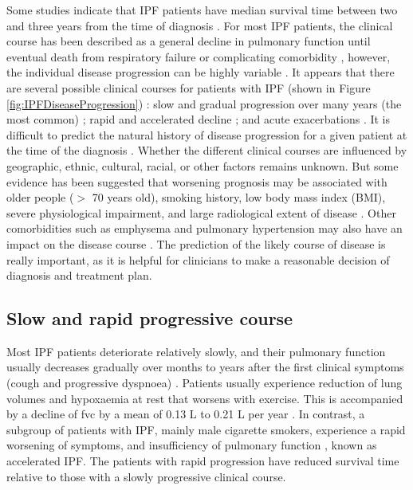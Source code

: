 Some studies indicate that IPF patients have median survival time between two and three years from the time of diagnosis \citep{bjoraker1998prognostic, flaherty2002clinical, nicholson2000prognostic, rudd2007british, king2001idiopathic, king2011idiopathic}. For most IPF patients, the clinical course has been described as a general decline in pulmonary function until eventual death from respiratory failure or complicating comorbidity \citep{carrington1978natural, tukiainen1983prognosis, gross2001idiopathic}, however, the individual disease progression can be highly variable \citep{kim2006classification,meltzer2008idiopathic}. It appears that there are several possible clinical courses for patients with IPF (shown in Figure \ref{fig:IPFDiseaseProgression}) \citep{raghu1987idiopathic}: slow and gradual progression over many years (the most common) \citep{ryu2014idiopathic,meltzer2008idiopathic,raghu2011official}; rapid and accelerated decline \citep{kim2006classification,selman2007accelerated}; and acute exacerbations \citep{king2011idiopathic,xaubet2017idiopathic}. It is difficult to predict the natural history of disease progression for a given patient at the time of the diagnosis \citep{raghu2011official}. Whether the different clinical courses are influenced by geographic, ethnic, cultural, racial, or other factors remains unknown. But some evidence has been suggested that worsening prognosis may be associated with older people ($>$ 70 years old), smoking history, low body mass index (BMI), severe physiological impairment, and large radiological extent of disease \citep{ley2011clinical}. Other comorbidities such as emphysema and pulmonary hypertension may also have an impact on the disease course \citep{mejia2009idiopathic, wells2003idiopathic, lettieri2006prevalence}. The prediction of the likely course of disease is really important, as it is helpful for clinicians to make a reasonable decision of diagnosis and treatment plan.
\newpage

\subsection{Slow and rapid progressive course}
Most IPF patients deteriorate relatively slowly, and their pulmonary function usually decreases gradually over months to years after the first clinical symptoms (cough and progressive dyspnoea) \citep{ryu2014idiopathic,meltzer2008idiopathic,raghu2011official}. Patients usually experience reduction of lung volumes and hypoxaemia at rest that worsens with exercise. This is accompanied by a decline of \gls{fvc}  by a mean of 0.13 L to 0.21 L per year \citep{ley2011clinical}. In contrast, a subgroup of patients with IPF, mainly male cigarette smokers, experience a rapid worsening of symptoms, and insufficiency of pulmonary function \citep{kim2006classification, king2011idiopathic}, known as accelerated IPF. The patients with rapid progression have reduced survival time relative to those with a slowly progressive clinical course.


